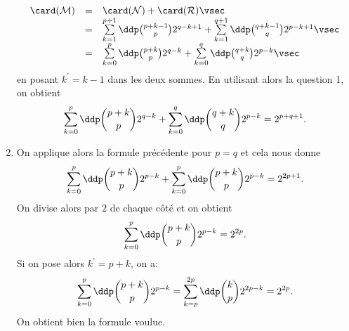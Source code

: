 \documentclass[a4paper, 11pt]{article}
\begin{document}
\begin{correction}
\begin{enumerate}
		      $$\begin{array}{lll}
				      \card (\mathcal{M}) & = & \card (\mathcal{N})+\card (\mathcal{R})\vsec                                                                       \\
				                          & = & \sum\limits_{k=1}^{p+1} \ddp \binom{p+k-1}{p}2^{q-k+1}+\sum\limits_{k=1}^{q+1} \ddp \binom{q+k-1}{q}2^{p-k+1}\vsec \\
				                          & = & \sum\limits_{k=0}^{p} \ddp \binom{p+k}{p}2^{q-k}+\sum\limits_{k=0}^{q} \ddp \binom{q+k}{q}2^{p-k}\vsec             \\
			      \end{array}
		      $$
		      en posant $k^{\prime}=k-1$ dans les deux sommes. En utilisant alors la question 1, on obtient
		      $$\sum\limits_{k=0}^{p} \ddp \binom{p+k}{p}2^{q-k}+\sum\limits_{k=0}^{q} \ddp \binom{q+k}{q}2^{p-k}=2^{p+q+1} .$$
		\item On applique alors la formule pr\'ec\'edente pour $p=q$ et cela nous donne
		      $$ \sum\limits_{k=0}^{p} \ddp \binom{p+k}{p}2^{p-k}+\sum\limits_{k=0}^{p} \ddp \binom{p+k}{p}2^{p-k}=2^{2p+1}  .$$
		      On divise alors par $2$ de chaque c\^ot\'e et on obtient
		      $$\sum\limits_{k=0}^{p} \ddp \binom{p+k}{p}2^{p-k}=2^{2p}.$$
		      Si on pose alors $k^{\prime}= p+k$, on a:
		      $$\sum\limits_{k=0}^{p} \ddp \binom{p+k}{p}2^{p-k}=\sum\limits_{k=p}^{2p} \ddp \binom{k}{p}2^{2p-k}=2^{2p}.$$
		      On obtient bien la formule voulue.
	\end{enumerate}
\end{correction}
\end{document}

